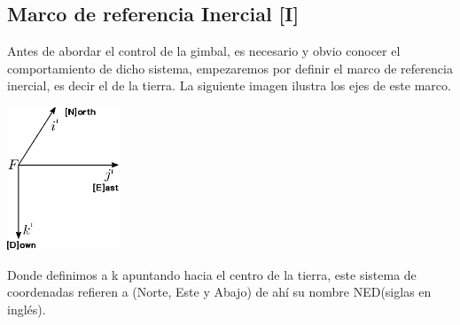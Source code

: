\subsection{Marco de referencia Inercial [I]}
Antes de abordar el control de la gimbal, es necesario y obvio conocer el comportamiento
de dicho sistema, empezaremos por definir el marco de referencia inercial, es decir
el de la tierra. La siguiente imagen ilustra los ejes de este marco.
\begin{center}
	\includegraphics[width=0.25\textwidth]{Contenido/Cuerpo/Capitulo3/Fig4.eps}
	\label{fig:ModeloMat:Fig1}
\end{center}
Donde definimos a k apuntando hacia el centro de la tierra, este sistema de coordenadas
refieren a (Norte, Este y Abajo) de ahí su nombre NED(siglas en inglés).

